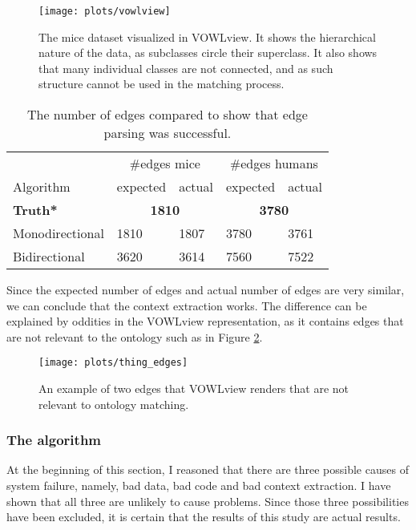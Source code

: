 \documentclass{article}
\begin{document}
  \begin{figure}[H]
  \centering
  \texttt{[image: plots/vowlview]}
  \caption[VOWLview of mice dataset]{The mice dataset visualized in VOWLview. It shows the hierarchical nature of the data, as subclasses circle their superclass. It also shows that many individual classes are not connected, and as such structure cannot be used in the matching process.}
  \label{vowlfig}
  \end{figure}
  
  \begin{table}[H]
  \centering
  \caption[Edge comparison]{The number of edges compared to show that edge parsing was successful.}
  \label{edgecounts}
  \begin{tabular}{l|ll|ll}  
  & \multicolumn{2}{c}{\#edges mice} & \multicolumn{2}{c|}{\#edges humans}\\
  Algorithm & expected & actual & expected & actual\\
  \hline
  \textbf{Truth*} & \multicolumn{2}{c|}{\textbf{1810}} & \multicolumn{2}{c}{\textbf{3780}} \\
  Monodirectional & 1810 & 1807 & 3780 & 3761\\
  Bidirectional & 3620 & 3614 & 7560 & 7522\\
  \end{tabular}
  \end{table}

  Since the expected number of edges and actual number of edges are very similar, we can conclude that the context extraction works. The difference can be explained by oddities in the VOWLview representation, as it contains edges that are not relevant to the ontology such as in Figure \ref{thing_edges}.
  
  \begin{figure}
  \centering
  \texttt{[image: plots/thing\_edges]}
  \caption[Addition edges example]{An example of two edges that VOWLview renders that are not relevant to ontology matching.}
  \label{thing_edges}
  \end{figure}
  
  \subsubsection{The algorithm}
  At the beginning of this section, I reasoned that there are three possible causes of system failure, namely, bad data, bad code and bad context extraction. I have shown that all three are unlikely to cause problems. Since those three possibilities have been excluded, it is certain that the results of this study are actual results.
 
\end{document}
